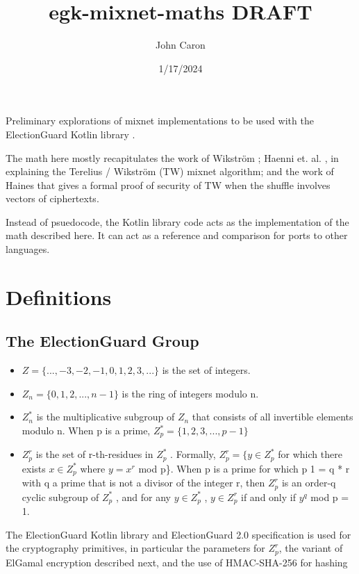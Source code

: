 \documentclass{article}
\title{egk-mixnet-maths DRAFT}
\author{John Caron}
\date{1/17/2024}
\begin{document}
\maketitle

Preliminary explorations of mixnet implementations to be used with
the ElectionGuard Kotlin library \cite{Caron23}. \par

The math here mostly recapitulates the work of Wikström \cite{Wikstr22}; Haenni
et. al. \cite{Haenni23} \cite{Haenni17}, in explaining the Terelius / Wikström (TW)
mixnet algorithm\cite{Wikstr10}\cite{Wikstr09}; and the work of Haines \cite{Haines19}
that gives a formal proof of security of TW when the shuffle involves
vectors of ciphertexts. \par

Instead of psuedocode, the Kotlin library code acts as the implementation
of the math described here. It can act as a reference and comparison
for ports to other languages. 

\pagebreak 

\section{Definitions}

\subsection{The ElectionGuard Group}
\begin{itemize}
\item $Z=\{...,-3,-2,-1,0,1,2,3,...\}$ is the set of integers. 
\item $Z_{n}=\{0,1,2,...,n-1\}$ is the ring of integers modulo n. 
\item $Z_{n}^{*}$ is the multiplicative subgroup of $Z_{n}$ that consists
of all invertible elements modulo n. When p is a prime, $Z_{p}^{*}=\{1,2,3,...,p-1\}$ 
\item $Z_{p}^{r}$ is the set of r-th-residues in $Z_{p}^{*}$ . Formally,
$Z_{p}^{r}=\{y\in Z_{p}^{*}$ for which there exists $x\in Z_{p}^{*}$
where $y=x^{r}$ mod p\}. When p is a prime for which p \textminus{}
1 = q {*} r with q a prime that is not a divisor of the integer r,
then $Z_{p}^{r}$ is an order-q cyclic subgroup of $Z_{p}^{*}$ ,
and for any $y\in Z_{p}^{*}$ , $y\in Z_{p}^{r}$ if and only if $y^{q}$
mod p = 1. 
\end{itemize}

The ElectionGuard Kotlin library \cite{Caron23} and ElectionGuard 2.0 specification \cite{Benaloh23} is used for the cryptography primitives, in particular the
parameters for $Z_{p}^{r}$, the variant of ElGamal encryption described
next, and the use of HMAC-SHA-256 for hashing
\end{document}
